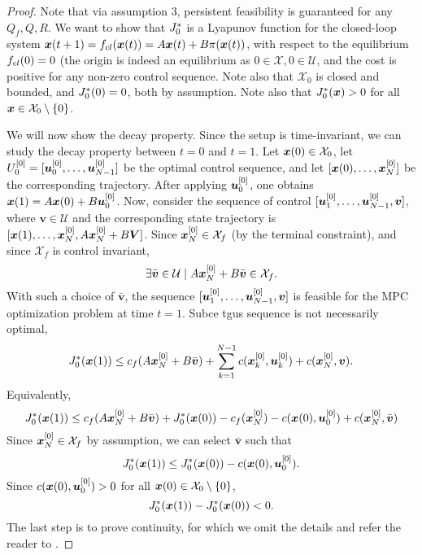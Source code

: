 \begin{proof}
Note that via assumption 3, persistent feasibility is guaranteed for any $Q_f, Q, R$. We want to show that $J_0^*$ is a Lyapunov function for the closed-loop system $\bm{x}(t+1) = f_{cl}(\bm{x}(t)) = A\bm{x}(t) + B \pi(\bm{x}(t))$, with respect to the equilibrium $f_{cl}(0) = 0$ (the origin is indeed an equilibrium as $0 \in \mathcal{X}, 0 \in \mathcal{U}$, and the cost is positive for any non-zero control sequence. Note also that $\mathcal{X}_0$ is closed and bounded, and $J_0^*(0)=0$, both by assumption. Note also that $J^*_0(\bm{x})>0$ for all $\bm{x} \in \mathcal{X}_0 \setminus \{0\}$.

We will now show the decay property. Since the setup is time-invariant, we can study the decay property between $t=0$ and $t=1$. Let $\bm{x}(0) \in \mathcal{X}_0$, let $U_0^{[0]} = [\bm{u}^{[0]}_0,\ldots,\bm{u}^{[0]}_{N-1}]$ be the optimal control sequence, and let $[\bm{x}(0), \ldots, \bm{x}^{[0]}_{N}]$ be the corresponding trajectory. After applying $\bm{u}^{[0]}_0$, one obtains $\bm{x}(1) = A \bm{x}(0) + B \bm{u}^{[0]}_0$. Now, consider the sequence of control $[\bm{u}^{[0]}_1,\ldots,\bm{u}^{[0]}_{N-1}, \bm{v}]$, where $\bm{v}\in \mathcal{U}$ and the corresponding state trajectory is $[\bm{x}(1), \ldots, \bm{x}^{[0]}_{N}, A\bm{x}^{[0]}_{N} + B \bm{V}]$. Since $\bm{x}^{[0]}_{N} \in \mathcal{X}_f$ (by the terminal constraint), and since $\mathcal{X}_f$ is control invariant, 
\begin{equation}
    \exists \bar{\bm{v}} \in \mathcal{U}\mid A \bm{x}^{[0]}_{N} + B \bar{\bm{v}} \in \mathcal{X}_f.
\end{equation}
With such a choice of $\bar{\bm{v}}$, the sequence $[\bm{u}^{[0]}_1,\ldots,\bm{u}^{[0]}_{N-1}, \bm{v}]$ is feasible for the MPC optimization problem at time $t=1$. Subce tgus sequence is not necessarily optimal, 
\begin{equation}
    J_0^*(\bm{x}(1)) \leq c_f(A \bm{x}^{[0]}_{N} + B \bar{\bm{v}}) + \sum_{k=1}^{N-1} c(\bm{x}^{[0]}_{k}, \bm{u}^{[0]}_{k}) + c(\bm{x}^{[0]}_{N}, \bm{v}).
\end{equation}
Equivalently, 
\begin{equation}
    J_0^*(\bm{x}(1)) \leq c_f(A \bm{x}^{[0]}_{N} + B \bar{\bm{v}}) + J^*_0(\bm{x}(0)) - c_f(\bm{x}^{[0]}_{N}) - c(\bm{x}(0), \bm{u}^{[0]}_{0}) + c(\bm{x}^{[0]}_{N}, \bar{\bm{v}})
\end{equation}
Since $\bm{x}^{[0]}_{N} \in \mathcal{X}_f$ by assumption, we can select $\bar{\bm{v}}$ such that 
\begin{equation}
    J_0^*(\bm{x}(1)) \leq J_0^*(\bm{x}(0)) - c(\bm{x}(0), \bm{u}^{[0]}_{0}).
\end{equation}
Since $c(\bm{x}(0), \bm{u}^{[0]}_{0})>0$ for all $\bm{x}(0) \in \mathcal{X}_0 \setminus \{0\}$,
\begin{equation}
    J_0^*(\bm{x}(1)) - J_0^*(\bm{x}(0)) < 0.
\end{equation}
The last step is to prove continuity, for which we omit the details and refer the reader to \cite{borrelli2017predictive}.
\end{proof}

